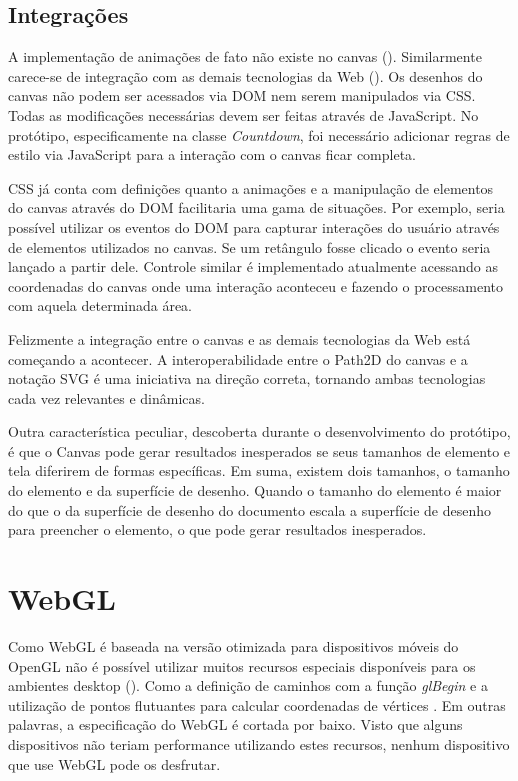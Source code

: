 \subsection{Integrações}

A implementação de animações de fato não existe no canvas
(). Similarmente carece-se de integração
com as demais tecnologias da Web ().
Os desenhos do canvas não podem ser acessados via DOM nem serem
manipulados via CSS. Todas as modificações necessárias devem ser
feitas através de JavaScript. No protótipo, especificamente na classe
\textit{Countdown}, foi necessário adicionar regras de estilo via
JavaScript para a interação com o canvas ficar completa.

CSS já conta com definições quanto a animações e a manipulação de
elementos do canvas através do DOM facilitaria uma gama de situações.
Por exemplo, seria possível utilizar os eventos do DOM para capturar
interações do usuário através de elementos utilizados no canvas.
Se um retângulo fosse clicado o evento seria lançado a partir dele.
Controle similar é implementado atualmente acessando as coordenadas
do canvas onde uma interação aconteceu e fazendo o processamento com
aquela determinada área.

Felizmente a integração entre o canvas e as demais tecnologias da
Web está começando a acontecer. A interoperabilidade entre o Path2D
do canvas e a notação SVG é uma iniciativa na direção correta,
tornando ambas tecnologias cada vez relevantes e dinâmicas.

Outra característica peculiar, descoberta durante o desenvolvimento
do protótipo, é que o Canvas pode gerar resultados inesperados se
seus tamanhos de elemento e tela diferirem de formas específicas. Em
suma, existem dois tamanhos, o tamanho do elemento e da superfície de
desenho. Quando o tamanho do elemento é maior do que o da superfície
de desenho do documento escala a superfície de desenho para preencher o
elemento, o que pode gerar resultados inesperados.

\section{WebGL}

Como WebGL é baseada na versão otimizada para dispositivos móveis do
OpenGL não é possível utilizar muitos recursos especiais disponíveis
para os ambientes desktop ().
Como a definição de caminhos com a função \textit{glBegin} e a
utilização de pontos flutuantes para calcular coordenadas de vértices
\autocite{esVsGl}. Em outras palavras, a especificação do WebGL é
cortada por baixo. Visto que alguns dispositivos não teriam performance
utilizando estes recursos, nenhum dispositivo que use WebGL pode os
desfrutar.

